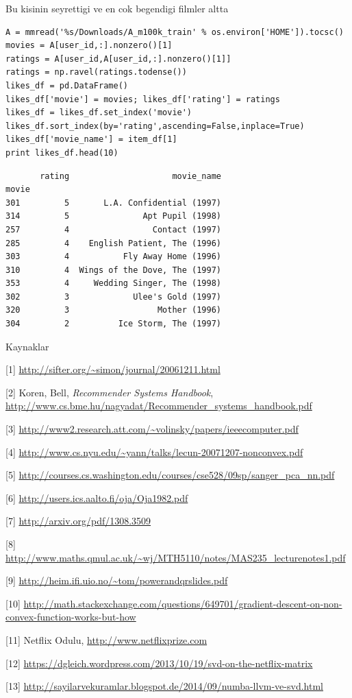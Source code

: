 \documentclass[12pt,fleqn]{article}\usepackage{../common}
\begin{document}
Bu kisinin seyrettigi ve en cok begendigi filmler altta

\begin{verbatim}
A = mmread('%s/Downloads/A_m100k_train' % os.environ['HOME']).tocsc()
movies = A[user_id,:].nonzero()[1]
ratings = A[user_id,A[user_id,:].nonzero()[1]]
ratings = np.ravel(ratings.todense())
likes_df = pd.DataFrame()
likes_df['movie'] = movies; likes_df['rating'] = ratings
likes_df = likes_df.set_index('movie')
likes_df.sort_index(by='rating',ascending=False,inplace=True)
likes_df['movie_name'] = item_df[1]
print likes_df.head(10)
\end{verbatim}

\begin{verbatim}
       rating                     movie_name
movie                                       
301         5       L.A. Confidential (1997)
314         5               Apt Pupil (1998)
257         4                 Contact (1997)
285         4    English Patient, The (1996)
303         4           Fly Away Home (1996)
310         4  Wings of the Dove, The (1997)
353         4     Wedding Singer, The (1998)
302         3             Ulee's Gold (1997)
320         3                  Mother (1996)
304         2          Ice Storm, The (1997)
\end{verbatim}

Kaynaklar

[1] \url{http://sifter.org/~simon/journal/20061211.html}

[2] Koren, Bell, {\em Recommender Systems Handbook},
\url{http://www.cs.bme.hu/nagyadat/Recommender_systems_handbook.pdf}

[3] \url{http://www2.research.att.com/~volinsky/papers/ieeecomputer.pdf}

[4] \url{http://www.cs.nyu.edu/~yann/talks/lecun-20071207-nonconvex.pdf}

[5] \url{http://courses.cs.washington.edu/courses/cse528/09sp/sanger_pca_nn.pdf}

[6] \url{http://users.ics.aalto.fi/oja/Oja1982.pdf}

[7] \url{http://arxiv.org/pdf/1308.3509}

[8] \url{http://www.maths.qmul.ac.uk/~wj/MTH5110/notes/MAS235_lecturenotes1.pdf}

[9] \url{http://heim.ifi.uio.no/~tom/powerandqrslides.pdf}

[10] \url{http://math.stackexchange.com/questions/649701/gradient-descent-on-non-convex-function-works-but-how}

[11] Netflix Odulu, \url{http://www.netflixprize.com}

[12] \url{https://dgleich.wordpress.com/2013/10/19/svd-on-the-netflix-matrix}

[13] \url{http://sayilarvekuramlar.blogspot.de/2014/09/numba-llvm-ve-svd.html}
\end{document}
